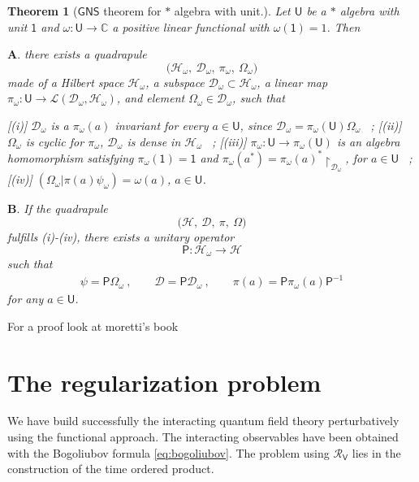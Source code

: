 \documentclass[11pt]{book}
\newcommand{\Dcal}{\mathcal{D}}
\newcommand{\Hcal}{\mathcal{H}}
\newcommand{\Lcal}{\mathcal{L}}
\newcommand{\Rcal}{\mathcal{R}}
\newcommand{\Cbb}{\mathbb{C}}
\newcommand{\Psf}{\mathsf{P}}
\newcommand{\Usf}{\mathsf{U}}
\newcommand{\Vsf}{\mathsf{V}}
\theoremstyle{break}
\newtheorem{theorem}{Theorem}[chapter]
\begin{document}
\begin{theorem}[$\mathsf{GNS}$ theorem for $\ast$ algebra with unit.]
 Let $\Usf$ be a $\ast$ algebra with unit $\mathsf{1}$ and $\omega : \Usf \to \Cbb$ a positive linear functional with $\omega(\mathsf{1})=1$. Then \par
 \noindent
 $\mathbf{A.}$ there exists a quadrapule 
 \begin{equation*}
  \bigg(\Hcal_\omega, \ \Dcal_\omega, \ \pi_\omega, \ \Omega_\omega\bigg)
 \end{equation*}
 made of a Hilbert space $\Hcal_\omega$, a subspace $\Dcal_\omega \subset \Hcal_\omega$, a linear map $\pi_\omega : \Usf \to \Lcal(\Dcal_\omega,\Hcal_\omega)$, and element $\Omega_\omega \in \Dcal_\omega$, such that
 
  [(i)] $\Dcal_\omega$ is a $\pi_\omega(a)$ invariant for every $a\in \Usf$, since $\Dcal_\omega=\pi_\omega(\Usf)\Omega_\omega$ \ ;
  [(ii)] $\Omega_\omega$ is cyclic for $\pi_\omega$, $\Dcal_\omega$ is dense in $\Hcal_\omega$ \ ;
  [(iii)] $\pi_\omega : \Usf \to \pi_\omega(\Usf)$ is an algebra homomorphism satisfying $\pi_\omega(\mathsf{1})=\mathsf{1}$ and $\pi_\omega(a^\ast) = \pi_\omega(a)^\ast\upharpoonright_{\Dcal_\omega}$, for $a\in \Usf$ \ ;
  [(iv)] $\left(\Omega_\omega | \pi(a) \psi_\omega\right)=\omega(a)$, $a\in\Usf$.
 
 $\mathbf{B.}$ If the quadrapule
 \begin{equation*}
  \bigg(\Hcal, \ \Dcal, \ \pi, \ \Omega\bigg)
 \end{equation*}
 fulfills (i)-(iv), there exists a unitary operator
 \begin{equation*}
  \Psf:\Hcal_\omega \to \Hcal 
 \end{equation*}
 such that 
 \begin{eqnarray*}
  \psi = \Psf \Omega_\omega \ , \qquad \Dcal = \Psf \Dcal_\omega \ , \qquad \pi(a) = \Psf \pi_\omega(a) \Psf^{-1} 
 \end{eqnarray*}
 for any $a \in \Usf$. 
\end{theorem}

For a proof look at moretti's book
\section{The regularization problem}\label{p:EPSTEIN_GLASER}


We have build successfully the interacting quantum field theory perturbatively using the functional approach. The interacting observables have been obtained with the Bogoliubov formula \eqref{eq:bogoliubov}. The problem using $\Rcal_\Vsf$ lies in the construction of the time ordered product.
\end{document}

